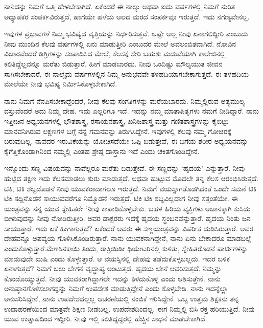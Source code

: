 ನಾನಿದನ್ನು ನಿಮಗೆ ಒತ್ತಿ ಹೇಳಬೇಕಾಗಿದೆ. ಏಕೆಂದರೆ ಈ ನಾಲ್ಕು ಅಥವಾ ಐದು ವರ್ಷಗಳಲ್ಲಿ ನಿಮಗೆ ನುರಿತ ಅಧ್ಯಾಪಕರ ಸಂಪರ್ಕವಿರುತ್ತದೆ, ಹಾಗಯೇ ಹಳೆಯ ಆಲದ ಮರದ ಸಂಪರ್ಕವೂ ಇರುತ್ತದೆ. ಇದು ನಗಣ್ಯವೇನಲ್ಲ.

ಇವುಗಳ ಪ್ರಭಾವಗಳೆ ನಿಮ್ಮ ಭವಿಷ್ಯದ ವೃತ್ತಿಯನ್ನು ನಿರ್ಧರಿಸುತ್ತವೆ. ಅಷ್ಟೇ ಅಲ್ಲ ನೀವು ಏನಾಗಲಿದ್ದೀರಿ ಎಂಬುದು ನೀವು ಮುಂದಿನ ಕೆಲವು ವರ್ಷಗಳಲ್ಲಿ ಏನು ಮಾಡುತ್ತೀರಿ ಎಂಬುದರ ಮೇಲೆ ಅವಲಂಬಿತವಾಗಿದೆ. ನೋವಿನ ವಿಚಾರವೆಂದರೆ ಡಿಗ್ರಿಗಳನ್ನು ಸಂಪಾದಿಸಿದ ಮೇಲೆ, ಕೆಲಸಕ್ಕೆ ಸೇರಿ ಬಹುಶಃ ಮದುವೆಯಾಗಿ ಕಾಲೇಜಿನಲ್ಲಿ ಕಲಿತಿದ್ದೆಲ್ಲವನ್ನೂ ಮರೆತು ಬಿಡುತ್ತಾರೆ. ಹೀಗೆ ಮಾಡಬಾರದು. ನೀವು ಒಂದಿಷ್ಟು ಮೌಲ್ಯಯುತ ಜೀವನ ಸಾಗಿಸಬೇಕಾದರೆ, ಈ ನಾಲ್ಕೈದು ವರ್ಷಗಳಲ್ಲಿನ ನಿಮ್ಮ ಅನುಭವವೇ ತಳಹದಿಯಾಗಬೇಕಾಗುತ್ತದೆ. ಈ ತಳಹದಿಯ ಮೇಲೆಯೇ ನೀವು ಭವಿಷ್ಯ ನಿರ್ಮಿಸಿಕೊಳ್ಳಬೇಕಾಗಿದೆ.

ನಾನು ನಿಮಗೆ ನೆನಪಿಸಬೇಕಾದ್ದೆಂದರೆ, ನೀವು ಕೆಲವು ಸಂಗತಿಗಳನ್ನು ಮರೆಯಬಾರದು. ನಿಮ್ಮಲ್ಲಿರುವ ಅತ್ಯಮುಲ್ಯ ವಸ್ತುವೆಂದರೆ ಅದು ನಿಮ್ಮ ದೇಹ. ಇದು ಎಲ್ಲರಿಗೂ ಇದೆ. ಇದನ್ನು ನಮ್ಮ ಮಾತಾಪಿತೃಗಳು ನಮಗೆ ನೀಡಿದ್ದಾರೆ. ನಾನು ಇತ್ತೀಚಿನ ಅಧ್ಯಯನಗಳಲ್ಲಿ ಭೌತಶಾಸ್ತ್ರ, ರಸಾಯನಶಾಸ್ತ್ರ, ಖನಿಜಶಾಸ್ತ್ರ ಮತ್ತು ಗಣಿತಶಾಸ್ತ್ರಗಳನ್ನು ಕೈಬಿಟ್ಟು ಮಾನವನಿಗಿರುವ ಲಕ್ಷಣಗಳ ಬಗ್ಗೆ ನನ್ನ ಗಮನವನ್ನು ತಿರುಗಿಸಿದ್ದೇನೆ. ಇವುಗಳಲ್ಲಿ ಕೆಲವು ನಮ್ಮ ಗೋಚರಕ್ಕೆ ಬರುವುದಿಲ್ಲ. ನಾವದರ ಇರುವಿಕೆಯನ್ನು ಯೋಚಿಸದೆಯೇ ಒಪ್ಪಿ ಬಿಡುತ್ತೇವೆ, ಈ ಬಗೆಯ ಶರೀರ ಅಧ್ಯಯನವನ್ನು ಕೈಗೆತ್ತಿಕೊಂಡಾಗಿನಿಂದ ನಮ್ಮಲ್ಲಿ ಎಂತಹ ಶ್ರೇಷ್ಠ ದಾಸ್ತಾನು ಇದೆ ಎಂದು ಚಕಿತಗೊಂಡಿದ್ದೇನೆ.

ಇನ್ನೊಂದು ಸಣ್ಣ ವಿಷಯವನ್ನು ನಾವೆಲ್ಲರೂ ಮರೆತು ಬಿಡುತ್ತೇವೆ. ಈ ಸಣ್ಣದನ್ನು ‘ಹೃದಯ’ ಎನ್ನುತ್ತಾರೆ. ನೀವು ಹುಟ್ಟಿದ ತಕ್ಷಣ ಇದು ಕೆಲಸಮಾಡಲು ಶುರು ಮಾಡುತ್ತದೆ. ಅಥವಾ ಹುಟ್ಟುವ ಮೊದಲೇ ತನ್ನ ಕೆಲಸ ಆರಂಭಿಸಿರುತ್ತದೆ. ಟಿಕಿ, ಟಿಕಿ ಶಬ್ದದೊಡನೆ ನೀವು ಯುವಕರಾದಾಗಲೂ ಇರುತ್ತದೆ. ನಿಮಗೆ ವಯಸ್ಸಾಗತೊಡಗಿದಂತೆ ಒಂದೇ ಸಮನೆ ಟಿಕಿ ಟಿಕಿ ಸದ್ದಿನೊಡನೆ ಸಾಯುವವರೆಗೂ ನಿಮ್ಮೊಡನೆ ಇರುತ್ತದೆ. ಟಿಕಿ ಟಿಕಿ ಶಬ್ದವಿಲ್ಲದಾಗ ನೀವು ಸತ್ತಂತೆಯೇ. ಈ ಯಂತ್ರವನ್ನು ನನ್ನ ಯುವ ಸ್ನೇಹಿತರೇ \enginline{-} ‘ನೀವು ಕಾಪಾಡಿಕೊಳ್ಳಬೇಕು. ಬಹಳ ಹಿರಿಯ ವ್ಯಕ್ತಿಗಳು ಅಚಾನಕ್ಕಾಗಿ ಕುಸಿದು ಬೀಳುವುದನ್ನು ನೀವು ನೋಡಿರುತ್ತೀರಿ. ಅವರ ಡಾಕ್ಟರರು ಇದಕ್ಕೆ ಹೃದಯ ಸ್ಥಂಬನವೆನ್ನುತ್ತಾರೆ. ಹೃದಯ ನಿಂತು ಜನ ಸಾಯುತ್ತಾರೆ. ಇದು ಏಕೆ ಹೀಗಾಗುತ್ತದೆ? ಏಕೆಂದರೆ ಅವರು ಈ ಸಣ್ಣಯಂತ್ರವನ್ನು ವಿಪರೀತ ದುಡಿಸಿರುತ್ತಾರೆ. ಅವರ ದೇಹವನ್ನೂ ಅಪವ್ಯಯ ಗೊಳಿಸಿಕೊಂಡಿರುತ್ತಾರೆ. ನಾನು ಯುವಕನಾಗಿದ್ದೇನೆ, ನಾನು ಏನು ಬೇಕಾದರೂ ಮಾಡಬಲ್ಲೆ ಎಂದುಕೊಳ್ಳುತ್ತಾರೆ.\break ಮೆಣಸಿನಕಾಯಿ ತಿಂದು, ರಾತ್ರಿಯಿಡೀ ಥಿಯೇಟರಿನಲ್ಲಿ ಕುಳಿತು, ಸ್ನೇಹಿತರೊಡನೆ ಪಾರ್ಟಿಗಳನ್ನು ಮಾಡುವುದೇ ಖುಷಿ ಎಂದು ಕೊಳ್ಳುತ್ತಾರೆ. ಆ ವಯಸ್ಸಿನಲ್ಲಿ ದೇಹವು ತಡೆದುಕೊಳ್ಳಬಲ್ಲದು. ಇದರ ಬಳಿಕ ಏನಾಗುತ್ತದೆ? ನಿಮಗೆ ಬಲು ಬೇಗನೆ ವೃದ್ಧಾಪ್ಯ ಅಂಟುತ್ತದೆ. ಹೃದಯ ಬೇನೆ ಆವರಿಸುತ್ತದೆ. ನಿಮ್ಮನ್ನು ಕೊಂಡೊಯ್ಯುತ್ತದೆ. ನೀವು ಯುವಕರಾಗಿದ್ದಾಗಲೇ ಇದನ್ನು ತಿಳಿದುಕೊಳ್ಳಿ ಎಂದು ಆಶಿಸುತ್ತೇನೆ. ನಾನು ಅನುಷ್ಠಾನಗೊಳಿಸಲಾಗದ್ದನ್ನು ನಿಮಗೆ ಉಪದೇಶ ಮಾಡುತ್ತಿದ್ದೇನೆ ಎಂದು ಕೊಳ್ಳಬೇಡಿ. ನಾನು ಇದನ್ನೆಲ್ಲಾ ಅನುಸರಿಸಿದ್ದೇನೆ, ನಾನು ಉಪದೇಶದಲ್ಲಲ್ಲ \enginline{-} ಆಚರಣೆಯಲ್ಲಿ ನಂಬಿಕೆ ಇರಿಸಿದ್ದೇನೆ. ಒಬ್ಬ ಉತ್ತಮ ಶಿಕ್ಷಕನು ತನ್ನ ಉದಾಹರಣೆಯಿಂದ ಮಾತ್ರವೇ ಶಿಕ್ಷಣ ನೀಡಬಲ್ಲ. ಉಪದೇಶದಿಂದಲ್ಲ. ಈಗ ನಿಮ್ಮಲ್ಲಿ ಬಿಸಿ ರಕ್ತ ಹರಿಯುತ್ತಿದೆ. ನೀವು ಯುವ ಉತ್ಸಾಹದಿಂದ ಇದ್ದೀರಿ. ನೀವು ಇಲ್ಲಿ ಕಲಿತಿದ್ದದ್ದರಲ್ಲಿ ಹೆಚ್ಚಿನ ಸಾಧನೆ ಮಾಡಬೇಕಾಗಿದೆ.

